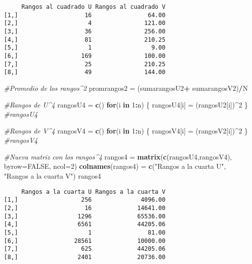 \documentclass[
  a4paper,
  oneside,
  openany]{book}
\newenvironment{Shaded}{\begin{snugshade}}{\end{snugshade}}
\newcommand{\AttributeTok}[1]{\textcolor[rgb]{0.13,0.29,0.53}{#1}}
\newcommand{\CommentTok}[1]{\textcolor[rgb]{0.56,0.35,0.01}{\textit{#1}}}
\newcommand{\ConstantTok}[1]{\textcolor[rgb]{0.56,0.35,0.01}{#1}}
\newcommand{\ControlFlowTok}[1]{\textcolor[rgb]{0.13,0.29,0.53}{\textbf{#1}}}
\newcommand{\DecValTok}[1]{\textcolor[rgb]{0.00,0.00,0.81}{#1}}
\newcommand{\FunctionTok}[1]{\textcolor[rgb]{0.13,0.29,0.53}{\textbf{#1}}}
\newcommand{\NormalTok}[1]{#1}
\newcommand{\OtherTok}[1]{\textcolor[rgb]{0.56,0.35,0.01}{#1}}
\newcommand{\SpecialCharTok}[1]{\textcolor[rgb]{0.81,0.36,0.00}{\textbf{#1}}}
\newcommand{\StringTok}[1]{\textcolor[rgb]{0.31,0.60,0.02}{#1}}
\begin{document}
\begin{verbatim}
     Rangos al cuadrado U Rangos al cuadrado V
[1,]                   16                64.00
[2,]                    4               121.00
[3,]                   36               256.00
[4,]                   81               210.25
[5,]                    1                 9.00
[6,]                  169               100.00
[7,]                   25               210.25
[8,]                   49               144.00
\end{verbatim}

\begin{Shaded}
\begin{Highlighting}[]
\CommentTok{\#Promedio de los rangos\^{}2}
\NormalTok{promrangos2 }\OtherTok{=}\NormalTok{ (sumarangosU2}\SpecialCharTok{+}\NormalTok{ sumarangosV2)}\SpecialCharTok{/}\NormalTok{N}

\CommentTok{\#Rangos de U\^{}4}
\NormalTok{rangosU4 }\OtherTok{=} \FunctionTok{c}\NormalTok{()}
\ControlFlowTok{for}\NormalTok{(i }\ControlFlowTok{in} \DecValTok{1}\SpecialCharTok{:}\NormalTok{n) \{}
\NormalTok{  rangosU4[i] }\OtherTok{=}\NormalTok{ (rangosU2[i])}\SpecialCharTok{\^{}}\DecValTok{2}
\NormalTok{\}}
\CommentTok{\#rangosU4}

\CommentTok{\#Rangos de V\^{}4}
\NormalTok{rangosV4 }\OtherTok{=} \FunctionTok{c}\NormalTok{()}
\ControlFlowTok{for}\NormalTok{(i }\ControlFlowTok{in} \DecValTok{1}\SpecialCharTok{:}\NormalTok{n) \{}
\NormalTok{  rangosV4[i] }\OtherTok{=}\NormalTok{ (rangosV2[i])}\SpecialCharTok{\^{}}\DecValTok{2}
\NormalTok{\}}
\CommentTok{\#rangosV4}

\CommentTok{\#Nueva matriz con los rangos\^{}4}
\NormalTok{rangos4 }\OtherTok{=} \FunctionTok{matrix}\NormalTok{(}\FunctionTok{c}\NormalTok{(rangosU4,rangosV4), }\AttributeTok{byrow=}\ConstantTok{FALSE}\NormalTok{, }\AttributeTok{ncol=}\DecValTok{2}\NormalTok{)}
\FunctionTok{colnames}\NormalTok{(rangos4) }\OtherTok{=} \FunctionTok{c}\NormalTok{(}\StringTok{"Rangos a la cuarta U"}\NormalTok{, }\StringTok{"Rangos a la cuarta V"}\NormalTok{)}
\NormalTok{rangos4}
\end{Highlighting}
\end{Shaded}

\begin{verbatim}
     Rangos a la cuarta U Rangos a la cuarta V
[1,]                  256              4096.00
[2,]                   16             14641.00
[3,]                 1296             65536.00
[4,]                 6561             44205.06
[5,]                    1                81.00
[6,]                28561             10000.00
[7,]                  625             44205.06
[8,]                 2401             20736.00
\end{verbatim}
\end{document}
